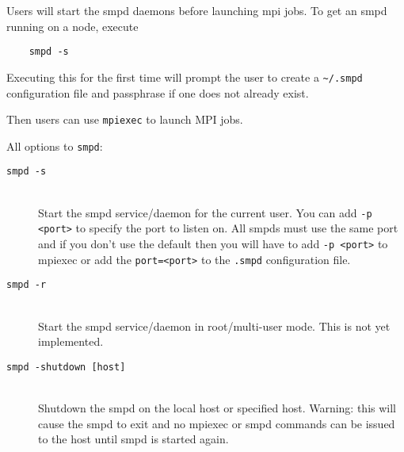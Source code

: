 \documentclass[dvipdfm,11pt]{article}
\begin{document}
Users will start the smpd daemons before launching mpi jobs.  To get an 
smpd running on a node, execute 
\begin{verbatim}
    smpd -s
\end{verbatim}
Executing this for the first time will prompt the user to create a 
\verb+~/.smpd+ configuration file and passphrase if one does not 
already exist.

Then users can use \texttt{mpiexec} to launch MPI jobs.

All options to \texttt{smpd}:

\begin{description}
\item[\texttt{smpd -s}]\mbox{}\\
Start the smpd service/daemon for the current user.  You can add 
\texttt{-p <port>} to specify the port to listen on.  All smpds must use
the same port and if you don't use the default then you will have to
add \texttt{-p <port>} to mpiexec or add the \texttt{port=<port>} to the 
\texttt{.smpd} configuration file.

\item[\texttt{smpd -r}]\mbox{}\\
Start the smpd service/daemon in root/multi-user mode.  This is not yet
implemented.

\item[\texttt{smpd -shutdown [host]}]\mbox{}\\
Shutdown the smpd on the local host or specified host.  Warning: this will
cause the smpd to exit and no mpiexec or smpd commands can be issued to the
host until smpd is started again.

%
%

\end{description}
\end{document}

